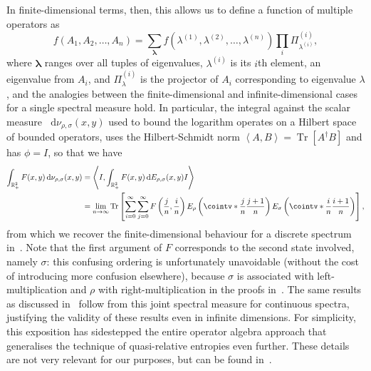 \documentclass[10pt, a4paper]{article}
\numberwithin{equation}{section} %
\theoremstyle{definition}
\theoremstyle{plain}
\newcommand{\dif}{\mathop{}\!\mathrm{d}} %
\newcommand{\?}{\mathrel{?}} %
\newcommand{\R}{\mathbb{R}} %
\newcommand{\cvec}[1]{\boldsymbol{\mathbf{#1}}}    %
\newcommand{\angleb}[1]{\left\langle #1 \right\rangle} %
\newcommand{\Tr}[2][]{\mathop{\mathrm{Tr}#1}\left[ #2 \right]} %
\begin{document}
\begin{appendices}
                          In finite-dimensional terms, then, this allows us to define a function of multiple operators as
                          \[f(A_1, A_2, \ldots, A_n) = \sum_{\cvec{\lambda}} f(\lambda^{(1)}, \lambda^{(2)}, \ldots, \lambda^{(n)}) \prod_i \Pi^{(i)}_{\lambda^{(i)}}, \]
                          where \(\cvec{\lambda}\) ranges over all tuples of eigenvalues, \(\lambda^{(i)}\) is its \(i\)th element, an eigenvalue from \(A_i\), and \(\Pi^{(i)}_{\lambda}\) is the projector of \(A_i\) corresponding to eigenvalue \(\lambda\), and the analogies between the finite-dimensional and infinite-dimensional cases for a single spectral measure hold. In particular, the integral against the scalar measure \(\dif{\nu_{\rho,\sigma}(x,y)}\) used to bound the logarithm operates on a Hilbert space of bounded operators, uses the Hilbert-Schmidt norm \(\angleb{A, B} = \Tr{A^{\dagger}B}\) and has \(\phi = I\), so that we have
                          \begin{align*}
                            \int_{\R_+^{2}} F(x,y) \dif{\nu_{\rho,\sigma}(x,y)} &= \angleb{I, \int_{\R_+^{2}} F(x,y) \dif{E_{\rho,\sigma}(x,y)} I} \\
                                                                                &= \lim_{n\to\infty} \Tr{ \sum_{i=0}^{\infty}\sum_{j=0}^{\infty} F\left(\frac{j}{n}, \frac{i}{n}\right) E_{\rho}\left(\cointv*{\frac{j}{n}}{\frac{j+1}{n}}\right)
                                                                                E_{\sigma}\left(\cointv*{\frac{i}{n}}{\frac{i+1}{n}}\right) },
                          \end{align*}
                          from which we recover the finite-dimensional behaviour for a discrete spectrum in~. Note that the first argument of \(F\) corresponds to the second state involved, namely \(\sigma\): this confusing ordering is unfortunately unavoidable (without the cost of introducing more confusion elsewhere), because \(\sigma\) is associated with left-multiplication and \(\rho\) with right-multiplication in the proofs in~\cite{BFF_QRE}. The same results as discussed in~ follow from this joint spectral measure for continuous spectra, justifying the validity of these results even in infinite dimensions. For simplicity, this exposition has sidestepped the entire operator algebra approach that generalises the technique of quasi-relative entropies even further. These details are not very relevant for our purposes, but can be found in~\cite{BFF_QRE}.


\end{appendices}
\end{document}
